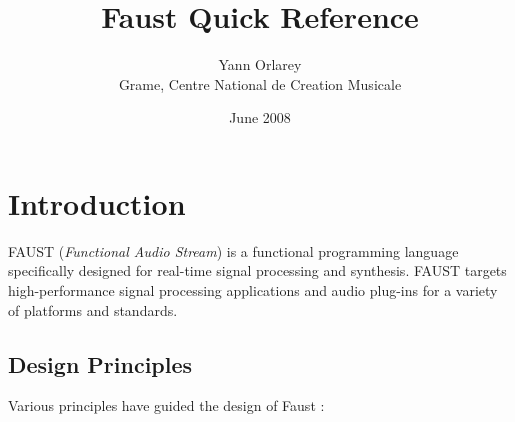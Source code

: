 \documentclass[a4paper]{book}
\begin{document}


\title{Faust Quick Reference}
\author{Yann Orlarey\\Grame, Centre National de Creation Musicale}
\date{June 2008}



\newcommand{\farg}[1]{\textrm{\textit{#1}}}
\newcommand{\ldbrack}{[\![ \,}
\newcommand{\rdbrack}{\, ]\!] }
\newcommand{\rdbrackC}{\rdbrack_{\mathrm{C}}\,}
\newcommand{\dbrack}[1]{\ldbrack #1 \rdbrack}
\newcommand{\semantic}[1]{\ldbrack #1 \rdbrack}
\newcommand{\dbrackC}[1]{\ldbrack #1 \rdbrackC}

\setlength{\parindent}{0pt}
\setlength{\parskip}{1ex plus 0.5ex minus 0.2ex}

\maketitle


\chapter{Introduction}

FAUST (\textit{Functional Audio Stream}) is a functional programming language specifically designed for real-time signal processing and synthesis.  FAUST targets high-performance signal processing applications and audio plug-ins for a variety of platforms and standards. 

\section{Design Principles}

Various principles have guided the design of Faust :
\end{document}
